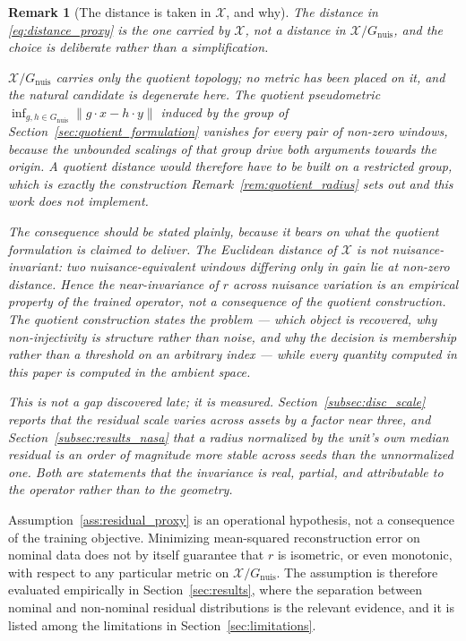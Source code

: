 \documentclass[a4paper]{cas-sc}
\newtheorem{remark}{Remark}
\newcommand{\X}{\ensuremath{\mathcal{X}}}
\newcommand{\Gnuis}{\ensuremath{G_{\mathrm{nuis}}}}
\newcommand{\quotient}{\ensuremath{\mathcal{X}/G_{\mathrm{nuis}}}}
\newcommand{\residual}{\ensuremath{r}}
\begin{document}
\begin{remark}[The distance is taken in \(\X\), and why]
\label{rem:distance_lives_in_X}
The distance in \eqref{eq:distance_proxy} is the one carried by \(\X\), not a
distance in \(\quotient\), and the choice is deliberate rather than a
simplification.

\(\quotient\) carries only the quotient topology; no metric has been placed on
it, and the natural candidate is degenerate here. The quotient pseudometric
\(\inf_{g,h\in\Gnuis}\lVert g\cdot x - h\cdot y\rVert\) induced by the group of
Section~\ref{sec:quotient_formulation} vanishes for every pair of non-zero
windows, because the unbounded scalings of that group drive both arguments
towards the origin. A quotient distance would therefore have to be built on a
restricted group, which is exactly the construction
Remark~\ref{rem:quotient_radius} sets out and this work does not implement.

The consequence should be stated plainly, because it bears on what the
quotient formulation is claimed to deliver. The Euclidean distance of \(\X\) is
\emph{not} nuisance-invariant: two nuisance-equivalent windows differing only
in gain lie at non-zero distance. Hence the near-invariance of \(\residual\)
across nuisance variation is an \emph{empirical property of the trained
operator}, not a consequence of the quotient construction. The quotient
construction states the problem --- which object is recovered, why
non-injectivity is structure rather than noise, and why the decision is
membership rather than a threshold on an arbitrary index --- while every
quantity computed in this paper is computed in the ambient space.

This is not a gap discovered late; it is measured. Section~\ref{subsec:disc_scale}
reports that the residual scale varies across assets by a factor near three,
and Section~\ref{subsec:results_nasa} that a radius normalized by the unit's own
median residual is an order of magnitude more stable across seeds than the
unnormalized one. Both are statements that the invariance is real, partial, and
attributable to the operator rather than to the geometry.
\end{remark}

Assumption~\ref{ass:residual_proxy} is an operational hypothesis, not a
consequence of the training objective. Minimizing mean-squared
reconstruction error on nominal data does not by itself guarantee that
\(\residual\) is isometric, or even monotonic, with respect to any
particular metric on \(\quotient\). The assumption is therefore evaluated
empirically in Section~\ref{sec:results}, where the separation between
nominal and non-nominal residual distributions is the relevant evidence,
and it is listed among the limitations in
Section~\ref{sec:limitations}.
\end{document}
